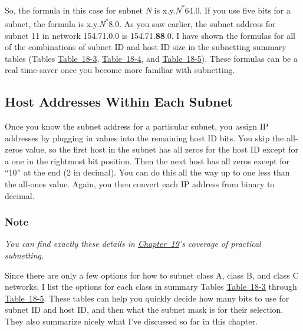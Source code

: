 So, the formula in this case for subnet {\emph{N}} is
x.y.{\emph{N}}\textsuperscript{*}64.0. If you use five bits for a
subnet, the formula is x.y.{\emph{N}}\textsuperscript{*}8.0. As you saw
earlier, the subnet address for subnet 11 in network 154.71.0.0 is
154.71.{\textbf{88}}.0. I have shown the formulas for all of the
combinations of subnet ID and host ID size in the subnetting summary
tables (Tables
\protect\hyperlink{ch18s07.htmlux5cux23subnetting_summary_table_for_class_a_net}{Table~18-3},
\protect\hyperlink{ch18s07.htmlux5cux23subnetting_summary_table_for_class_b_net}{Table~18-4},
and
\protect\hyperlink{ch18s07.htmlux5cux23subnetting_summary_table_for_class_c_net}{Table~18-5}).
These formulas can be a real time-saver once you become more familiar
with subnetting.

\subsection[Host Addresses Within Each
Subnet]{\texorpdfstring{Host
Addresses Within Each Subnet}{Host Addresses Within Each Subnet}}

Once you know the subnet address for a particular subnet, you assign IP
addresses by plugging in values into the remaining host ID bits. You
skip the all-zeros value, so the first host in the subnet has all zeros
for the host ID except for a one in the rightmost bit position. Then the
next host has all zeros except for ``10'' at the end (2 in decimal). You
can do this all the way up to one less than the all-ones value. Again,
you then convert each IP address from binary to decimal.

\subsubsection[Note]{\texorpdfstring{Note}{Note}}

{\emph{You can find exactly these details in
\protect\hyperlink{ch19.html}{Chapter~19}'s coverage of practical
subnetting}}.



Since there
are only a few options for how to subnet class A, class B, and class C
networks, I list the options for each class in summary Tables
\protect\hyperlink{ch18s07.htmlux5cux23subnetting_summary_table_for_class_a_net}{Table~18-3}
through
\protect\hyperlink{ch18s07.htmlux5cux23subnetting_summary_table_for_class_c_net}{Table~18-5}.
These tables can help you quickly decide how many bits to use for subnet
ID and host ID, and then what the subnet mask is for their selection.
They also summarize nicely what I've discussed so far in this chapter.

